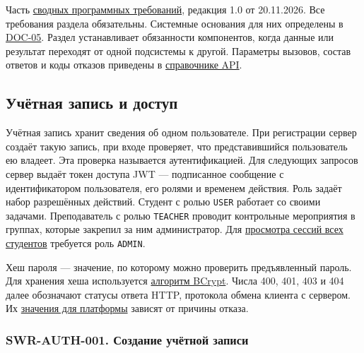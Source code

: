 \documentclass[12pt,a4paper]{article}
\begin{document}
\hypertarget{doc-06-программные-требования-платформы}{}

Часть {\hyperlink{doc-06-сводные-программные-требования}{сводных программных требований}}, редакция 1.0 от 20.11.2026. Все требования раздела обязательны. Системные основания для них определены в {\href{../04\_Системные\_требования/DOC-05\_Системные\_требования.pdf\#doc-05-платформенные-и-предметные-требования}{DOC-05}}. Раздел устанавливает обязанности компонентов, когда данные или результат переходят от одной подсистемы к другой. Параметры вызовов, состав ответов и коды отказов приведены в {\href{../09\_Архитектура\_и\_API/DOC-08\_Справочник\_API.pdf\#doc-08-справочник-api-платформы}{справочнике API}}.

\subsection{Учётная запись и доступ}\label{ux443ux447ux451ux442ux43dux430ux44f-ux437ux430ux43fux438ux441ux44c-ux438-ux434ux43eux441ux442ux443ux43f}

\hypertarget{учётная-запись-и-доступ}{}

Учётная запись хранит сведения об одном пользователе. При регистрации сервер создаёт такую запись, при входе проверяет, что представившийся пользователь ею владеет. Эта проверка называется аутентификацией. Для следующих запросов сервер выдаёт токен доступа JWT --- подписанное сообщение с идентификатором пользователя, его ролями и временем действия. Роль задаёт набор разрешённых действий. Студент с ролью \texttt{USER} работает со своими задачами. Преподаватель с ролью \texttt{TEACHER} проводит контрольные мероприятия в группах, которые закрепил за ним администратор. Для {\hyperlink{swr-cfg-002}{просмотра сессий всех студентов}} требуется роль \texttt{ADMIN}.

Хеш пароля --- значение, по которому можно проверить предъявленный пароль. Для хранения хеша используется {\hyperlink{swr-auth-008-передача-и-хранение-пароля}{алгоритм BCrypt}}. Числа 400, 401, 403 и 404 далее обозначают статусы ответа HTTP, протокола обмена клиента с сервером. Их {\hyperlink{swr-sys-009-маршрутизация-и-представление-ошибок}{значения для платформы}} зависят от причины отказа.

\subsubsection{SWR-AUTH-001. Создание учётной записи}\label{swr-auth-001-ux441ux43eux437ux434ux430ux43dux438ux435-ux443ux447ux451ux442ux43dux43eux439-ux437ux430ux43fux438ux441ux438}
\end{document}
